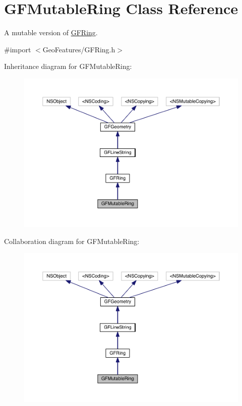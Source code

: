 \hypertarget{interface_g_f_mutable_ring}{}\section{G\+F\+Mutable\+Ring Class Reference}
\label{interface_g_f_mutable_ring}


A mutable version of \hyperlink{interface_g_f_ring}{G\+F\+Ring}.  




{\ttfamily \#import $<$Geo\+Features/\+G\+F\+Ring.\+h$>$}



Inheritance diagram for G\+F\+Mutable\+Ring\+:
\nopagebreak
\begin{figure}[H]
\begin{center}
\leavevmode
\includegraphics[width=350pt]{interface_g_f_mutable_ring__inherit__graph}
\end{center}
\end{figure}


Collaboration diagram for G\+F\+Mutable\+Ring\+:
\nopagebreak
\begin{figure}[H]
\begin{center}
\leavevmode
\includegraphics[width=350pt]{interface_g_f_mutable_ring__coll__graph}
\end{center}
\end{figure}
